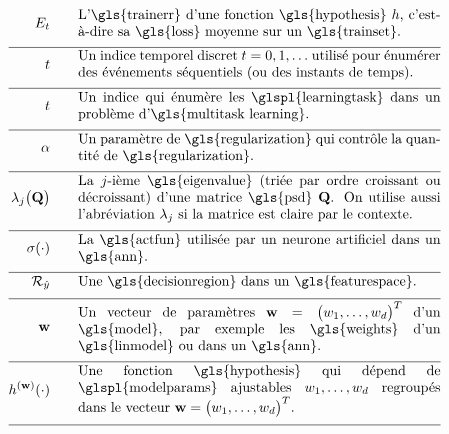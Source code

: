 \begin{align}
	\trainerror \quad\quad &\parbox{.75\textwidth}{L’\gls{trainerr} d’une fonction \gls{hypothesis} $\hypothesis$, c’est-à-dire sa \gls{loss} moyenne sur un \gls{trainset}.} \nonumber \\[2mm] \hline \nonumber\\[-5mm]
	\timeidx \quad\quad &\parbox{.75\textwidth}{Un indice temporel discret $\timeidx=0,1,\ldots$ utilisé pour énumérer des événements séquentiels (ou des instants de temps).} \nonumber \\[2mm] \hline \nonumber\\[-5mm]
	\taskidx \quad\quad &\parbox{.75\textwidth}{Un indice qui énumère les \glspl{learningtask} dans un problème d’\gls{multitask learning}.} \nonumber \\[2mm] \hline \nonumber\\[-5mm]
	\regparam \quad\quad &\parbox{.75\textwidth}{Un paramètre de \gls{regularization} qui contrôle la quantité de \gls{regularization}.} \nonumber \\[2mm] \hline \nonumber\\[-5mm]
	\eigval{\featureidx}\big( \mathbf{Q} \big) \quad\quad &\parbox{.75\textwidth}{La $\featureidx$-ième \gls{eigenvalue} (triée par ordre croissant ou décroissant) d’une matrice \gls{psd} $\mathbf{Q}$. On utilise aussi l’abréviation $\eigval{\featureidx}$ si la matrice est claire par le contexte.} \nonumber \\[2mm] \hline \nonumber\\[-5mm]
	\actfun(\cdot) \quad\quad &\parbox{.75\textwidth}{La \gls{actfun} utilisée par un neurone artificiel dans un \gls{ann}.} \nonumber \\[2mm] \hline \nonumber\\[-5mm]
	\decreg{\hat{\truelabel}} \quad\quad &\parbox{.75\textwidth}{Une \gls{decisionregion} dans un \gls{featurespace}.} \nonumber \\[2mm] \hline \nonumber\\[-5mm]  
	\weights  \quad\quad & \parbox{.75\textwidth}{Un vecteur de paramètres $\weights = \big(\weight_{1},\ldots,\weight_{\featuredim}\big)^{T}$ d’un \gls{model}, par exemple les \gls{weights} d’un \gls{linmodel} ou dans un \gls{ann}.} \nonumber \\[2mm] \hline \nonumber\\[-5mm]
	\hypothesis^{(\weights)}(\cdot)  \quad\quad &\parbox{.75\textwidth}{Une fonction \gls{hypothesis} qui dépend de \glspl{modelparams} ajustables $\weight_{1},\ldots,\weight_{\featuredim}$ regroupés dans le vecteur $\weights=\big(\weight_{1},\ldots,\weight_{\featuredim} \big)^{T}$.} \nonumber \\[2mm] \hline \nonumber\\[-5mm]

\end{align}
